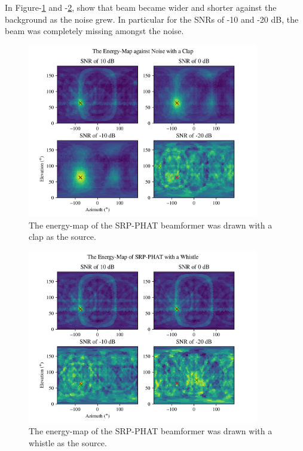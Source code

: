 \documentclass[notitlepage]{report}
\begin{document}
In Figure-\ref{fig:mm_noise_map_clap} and -\ref{fig:mm_noise_map_whistle}, show that beam became wider and shorter against the background as the noise grew. In particular for the SNRs of -10 and -20 \si{dB}, the beam was completely missing amongst the noise.

\begin{figure}[H]
\includegraphics[width=0.9\textwidth]{../Python/main_method/noise/clap/map.png}
\centering
\caption{The energy-map of the SRP-PHAT beamformer was drawn with a clap as the source.}
\label{fig:mm_noise_map_clap}
\centering
\end{figure}

\begin{figure}[H]
\includegraphics[width=0.9\textwidth]{../Python/main_method/noise/whistle/map.png}
\centering
\caption{The energy-map of the SRP-PHAT beamformer was drawn with a whistle as the source.}
\label{fig:mm_noise_map_whistle}
\centering
\end{figure}
\end{document}
